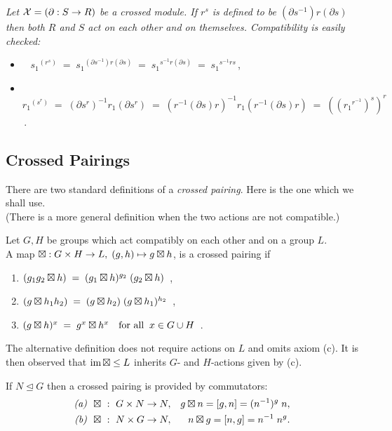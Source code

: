 \begin{example} \label{ex:xmod-actions}
\emph{Let $\mathcal{X} = (\partial : S \to R)$ be a crossed module.
If $r^s$ is defined to be $(\partial s^{-1})r(\partial s)$ 
then both $R$ and $S$ act on each other and on themselves.
Compatibility is easily checked:}
\begin{itemize}
\item~
${s_1}^{(r^s)} \;=\; {s_1}^{(\partial s^{-1})r(\partial s)}
\;=\;  {s_1}^{s^{-1}r(\partial s)}
\;=\;  {s_1}^{s^{-1}rs}$\,,
\item~
${r_1}^{(s^r)} \;=\; (\partial {s^r})^{-1} r_1 (\partial s^r) 
\;=\; (r^{-1}(\partial s)r)^{-1} r_1 (r^{-1}(\partial s)r)
\;=\; (({r_1}^{r^{-1}})^s)^r$\,.
\end{itemize}
\end{example}


\bigskip
\subsection{Crossed Pairings} \label{subs:xp}

There are two standard definitions of a \emph{crossed pairing}.
Here is the one which we shall use.\\
(There is a more general definition when the two actions are
not compatible.)

\begin{defn} \label{def:xpair} 
 
Let  $G,H$  be groups which act compatibly on each other 
and on a group  $L$.\\
A map  $\boxtimes : G \times H \to L,\; (g,h) \mapsto g \boxtimes h$,
is a crossed pairing if
\begin{enumerate}[{\rm (a)}]
\item\quad
$(g_1g_2 \boxtimes h) \;=\; (g_1 \boxtimes h)^{g_2}\;(g_2 \boxtimes h)$~,
\item\quad
$(g \boxtimes h_1h_2) \;=\; (g \boxtimes h_2)\;(g \boxtimes h_1)^{h_2}$~,
\item\quad
$(g \boxtimes h)^x  \;=\; g^x \boxtimes h^x \quad \mbox{for all} 
   \;\; x \in G \cup H$~. 
\end{enumerate}
\end{defn}

The alternative definition does not require actions on  $L$
and omits axiom (c).
It is then observed that   
$\mathrm{im}\, \boxtimes \leq L$  inherits  $G$-  and  $H$-actions given by (c).

\begin{example}
If $N \unlhd G$ then a crossed pairing is provided by commutators:
\begin{eqnarray*}
\mbox{\emph{(a)}}~~ \boxtimes ~:~ G \times N \to N,
 && g \boxtimes n = [g,n] = (n^{-1})^g \; n, \\
\mbox{\emph{(b)}}~~ \boxtimes ~:~ N \times G \to N,
 && n \boxtimes g = [n,g] = n^{-1} \; n^g. \\
\end{eqnarray*}
\end{example}


